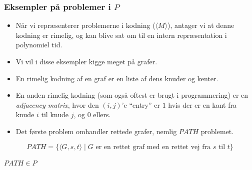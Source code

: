 \begin{frame}[allowframebreaks]
	\frametitle{Eksempler på problemer i $P$}
	\begin{itemize}
		\item Når vi repræsenterer problemerne i kodning (\(\langle M \rangle\)), antager vi at denne kodning er rimelig, og kan blive sat om til en intern repræsentation i polynomiel tid.
		\item Vi vil i disse eksempler kigge meget på grafer.
		\item En rimelig kodning af en graf er en liste af dens knuder og kenter.
		\item En anden rimelig kodning (som også oftest er brugt i programmering) er en \textit{adjacency matrix}, hvor den $(i,j)$'e ``entry'' er $1$ hvis der er en kant fra knude $i$ til knude $j$, og 0 ellers.
		\item Det første problem omhandler rettede grafer, nemlig $PATH$ problemet.
	\end{itemize}

	\begin{equation}
		PATH = \{\langle G, s, t \rangle \mid G \text{ er en rettet graf med en rettet vej fra } s \text{ til } t\}
	\end{equation}

	\begin{theorem}
		$PATH \in P$
	\end{theorem}


\end{frame}
